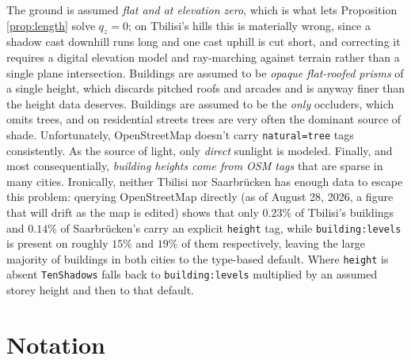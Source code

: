 \documentclass[11pt,a4paper]{article}
\theoremstyle{plain}
\theoremstyle{definition}
\theoremstyle{remark}
\begin{document}
The ground is assumed \emph{flat and at elevation zero}, which is what lets Proposition \ref{prop:length} solve $q_z = 0$; on Tbilisi's hills this is materially wrong, since a shadow cast downhill runs long and one cast uphill is cut short, and correcting it requires a digital elevation model and ray-marching against terrain rather than a single plane intersection. Buildings are assumed to be \emph{opaque flat-roofed prisms} of a single height, which discards pitched roofs and arcades and is anyway finer than the height data deserves. Buildings are assumed to be the \emph{only} occluders, which omits trees, and on residential streets trees are very often the dominant source of shade. Unfortunately, OpenStreetMap doesn't carry \texttt{natural=tree} tags consistently. As the source of light, only \emph{direct} sunlight is modeled. Finally, and most consequentially, \emph{building heights come from OSM tags} that are sparse in many cities. Ironically, neither Tbilisi nor Saarbr\"ucken has enough data to escape this problem: querying OpenStreetMap directly (as of August 28, 2026, a figure that will drift as the map is edited) shows that only $0.23\%$ of Tbilisi's buildings and $0.14\%$ of Saarbr\"ucken's carry an explicit \texttt{height} tag, while \texttt{building:levels} is present on roughly $15\%$ and $19\%$ of them respectively, leaving the large majority of buildings in both cities to the type-based default. Where \texttt{height} is absent \texttt{TenShadows} falls back to \texttt{building:levels} multiplied by an assumed storey height and then to that default.

\section{Notation}
\label{sec:notation}
\end{document}
